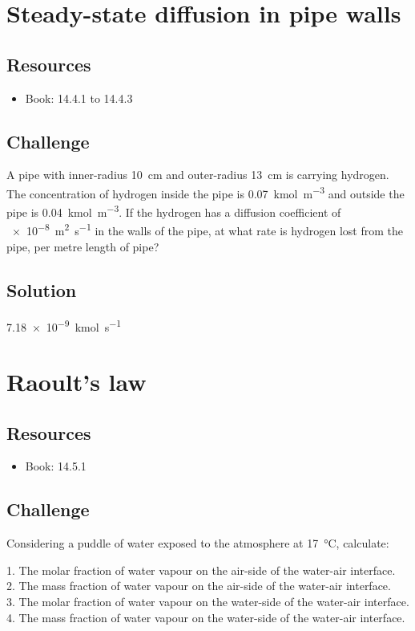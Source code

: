 \newpage
\section{Steady-state diffusion in pipe walls}

\subsection*{Resources}
\begin{itemize}
    \item Book: 14.4.1 to 14.4.3
\end{itemize}

\subsection*{Challenge}
A pipe with inner-radius \SI{10}{\cm} and outer-radius \SI{13}{\cm} is carrying hydrogen. The concentration of hydrogen inside the pipe is \SI{0.07}{\kmol\per\cubic\meter} and outside the pipe is \SI{0.04}{\kmol\per\cubic\meter}. If the hydrogen has a diffusion coefficient of \SI{e-8}{\square\meter\per\second} in the walls of the pipe, at what rate is hydrogen lost from the pipe, per metre length of pipe?

\subsection*{Solution}
\SI{7.18e-9}{\kmol\per\second}




\newpage
\section{Raoult's law}

\subsection*{Resources}
\begin{itemize}
    \item Book: 14.5.1
\end{itemize}

\subsection*{Challenge}
Considering a puddle of water exposed to the atmosphere at \SI{17}{\celsius}, calculate:

1. The molar fraction of water vapour on the air-side of the water-air interface.\\
2. The mass fraction of water vapour on the air-side of the water-air interface.\\
3. The molar fraction of water vapour on the water-side of the water-air interface.\\
4. The mass fraction of water vapour on the water-side of the water-air interface.

